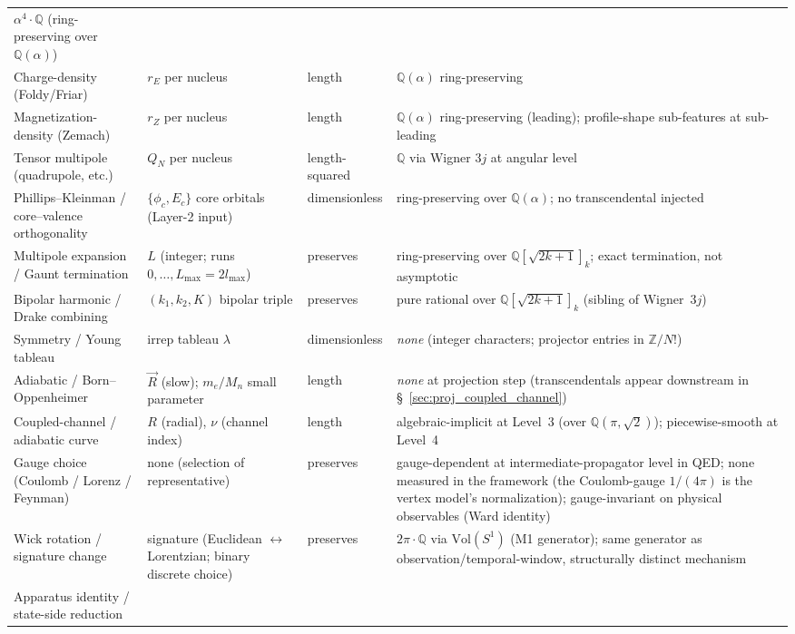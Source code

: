 \documentclass[11pt]{article}
\begin{document}
\begin{table}[h]
\begin{tabular}{p{3.5cm} p{3cm} p{2cm} p{4cm}}
$\alpha^4 \cdot \mathbb{Q}$ (ring-preserving over $\mathbb{Q}(\alpha)$) \\
Charge-density (Foldy/Friar) & $r_E$ per nucleus & length &
$\mathbb{Q}(\alpha)$ ring-preserving \\
Magnetization-density (Zemach) & $r_Z$ per nucleus & length &
$\mathbb{Q}(\alpha)$ ring-preserving (leading); profile-shape
sub-features at sub-leading \\
Tensor multipole (quadrupole, etc.) & $Q_N$ per nucleus &
length-squared & $\mathbb{Q}$ via Wigner $3j$ at angular level \\
Phillips--Kleinman / core--valence orthogonality &
$\{\phi_c, E_c\}$ core orbitals (Layer-2 input) & dimensionless &
ring-preserving over $\mathbb{Q}(\alpha)$; no transcendental injected \\
Multipole expansion / Gaunt termination &
$L$ (integer; runs $0,\ldots,L_\text{max} = 2 l_\text{max}$) &
preserves & ring-preserving over $\mathbb{Q}[\sqrt{2k{+}1}]_k$;
exact termination, not asymptotic \\
Bipolar harmonic / Drake combining &
$(k_1, k_2, K)$ bipolar triple & preserves &
pure rational over $\mathbb{Q}[\sqrt{2k{+}1}]_k$ (sibling of Wigner~$3j$) \\
Symmetry / Young tableau &
irrep tableau $\lambda$ & dimensionless &
\textit{none} (integer characters; projector entries in $\mathbb{Z}/N!$) \\
Adiabatic / Born--Oppenheimer &
$\vec{R}$ (slow); $m_e / M_n$ small parameter & length &
\textit{none} at projection step (transcendentals appear downstream
in \S~\ref{sec:proj_coupled_channel}) \\
Coupled-channel / adiabatic curve &
$R$ (radial), $\nu$ (channel index) & length &
algebraic-implicit at Level~3 (over $\mathbb{Q}(\pi,\sqrt{2})$);
piecewise-smooth at Level~4 \\
Gauge choice (Coulomb / Lorenz / Feynman) &
none (selection of representative) & preserves &
gauge-dependent at intermediate-propagator level in QED; none measured
in the framework (the Coulomb-gauge $1/(4\pi)$ is the vertex model's
normalization); gauge-invariant on physical observables (Ward identity) \\
Wick rotation / signature change &
signature (Euclidean $\leftrightarrow$ Lorentzian; binary discrete
choice) & preserves &
$2\pi\cdot\mathbb{Q}$ via $\mathrm{Vol}(S^1)$ (M1 generator);
same generator as observation/temporal-window, structurally distinct
mechanism \\
Apparatus identity / state-side reduction &

\end{tabular}
\end{table}
\end{document}
